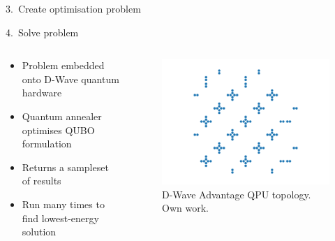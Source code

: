 \documentclass{beamer}
\begin{document}
\begin{frame}{3.\ Create optimisation problem}
    

\end{frame}

\begin{frame}{4.\ Solve problem}

    \begin{columns}
        \begin{column}{.5\textwidth}
            \begin{itemize}[<+(1)->]
                \item Problem embedded onto D-Wave quantum hardware
                \item Quantum annealer optimises QUBO formulation
                \item Returns a sampleset of results
                \item Run many times to find lowest-energy solution
            \end{itemize}
        \end{column}
        \begin{column}{.5\textwidth}
            \begin{figure}
                \includegraphics[width=\textwidth]{pegasus.pdf}
                \caption{D-Wave Advantage QPU topology. Own work.}
            \end{figure}
        \end{column}
    \end{columns}
    

\end{frame}
\end{document}
